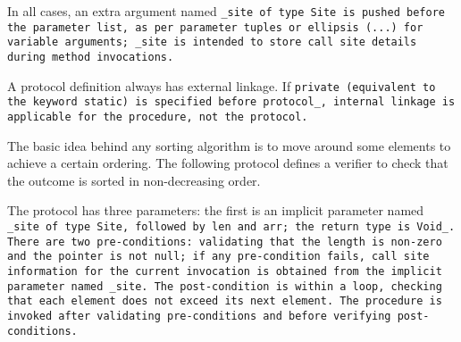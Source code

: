 In all cases, an extra argument named \tt{_site} of
type \tt{Site} is pushed before the parameter list,
as per parameter tuples or ellipsis (\tt{...}) for variable arguments;
\tt{_site} is intended to store call site details during method invocations.

A protocol definition always has external linkage.
If \tt{private} (equivalent to the keyword \tt{static}) is specified before
\tt{protocol_}, internal linkage is applicable for the procedure, not the protocol.

\example The basic idea behind any sorting algorithm is to
move around some elements to achieve a certain ordering.
The following protocol defines a verifier to check
that the outcome is sorted in non-decreasing order.


The protocol has three parameters: the first is an implicit
parameter named \tt{_site} of type \tt{Site}, followed
by \tt{len} and \tt{arr}; the return type is \tt{Void_}.
There are two pre-conditions: validating that the length is non-zero and the
pointer is not null; if any pre-condition fails, call site information for the
current invocation is obtained from the implicit parameter named \tt{_site}.
The post-condition is within a loop, checking that
each element does not exceed its next element.
The procedure is invoked after validating pre-conditions
and before verifying post-conditions.
